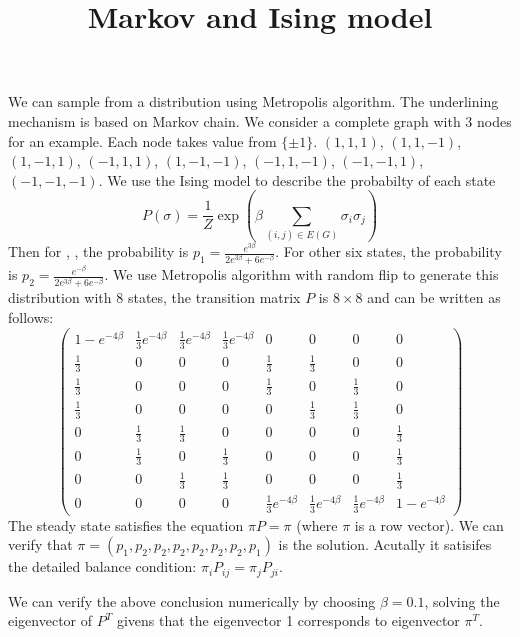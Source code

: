\documentclass{article}
\title{Markov and Ising model}
\begin{document}
\maketitle
We can sample from a distribution using Metropolis algorithm. The underlining mechanism is
based on Markov chain. We consider a complete graph with 3 nodes for an example.
Each node takes value from $\{\pm 1\}$.
 $(1,1,1)$,
 $(1,1,-1)$, $(1,-1,1)$, $(-1,1,1)$,
 $(1,-1,-1)$, $(-1,1,-1)$, $(-1,-1,1)$,
 $(-1,-1,-1)$.
We use the Ising model to describe the probabilty of each state
$$
P(\sigma) = \frac{1}{Z} \exp(\beta \sum_{(i,j) \in E(G)} \sigma_i \sigma_j)
$$
Then for , , the probability is
$p_1 = \frac{e^{3\beta}}{2e^{3\beta} + 6 e^{-\beta}}$.
For other six states, the probability is 
$p_2 = \frac{e^{-\beta}}{2e^{3\beta} + 6 e^{-\beta}}$.
We use Metropolis algorithm with random flip to generate this distribution with 8 states,
the transition matrix $P$ is  $8\times 8$ and can be written as follows:
$$
\begin{pmatrix}
1-e^{-4\beta} & \frac{1}{3} e^{-4\beta} & \frac{1}{3} e^{-4\beta} & \frac{1}{3} e^{-4\beta} & 0 & 0 & 0 & 0 \\
\frac{1}{3} & 0 & 0 & 0 & \frac{1}{3} & \frac{1}{3} & 0 & 0 \\
\frac{1}{3}& 0 & 0 & 0 & \frac{1}{3} & 0 & \frac{1}{3} & 0 \\
\frac{1}{3} & 0 & 0 & 0 & 0 & \frac{1}{3} & \frac{1}{3} & 0 \\
0 & \frac{1}{3} & \frac{1}{3} & 0 & 0 & 0 & 0 & \frac{1}{3} \\
0 & \frac{1}{3} & 0 & \frac{1}{3} & 0 & 0 & 0 & \frac{1}{3} \\
0 & 0 & \frac{1}{3} & \frac{1}{3} & 0 & 0 & 0 & \frac{1}{3} \\
0 & 0 & 0 & 0 &  \frac{1}{3} e^{-4\beta} & \frac{1}{3} e^{-4\beta} & \frac{1}{3} e^{-4\beta} & 1-e^{-4\beta}
\end{pmatrix}
$$
The steady state satisfies the equation $\pi P = \pi$ (where $\pi$ is a row vector).
We can verify that $\pi = (p_1, p_2, p_2, p_2, p_2, p_2, p_2, p_1)$ is the solution.
Acutally it satisifes the detailed balance condition: $\pi_i P_{ij} = \pi_j P_{ji}$.

We can verify the above conclusion numerically by choosing $\beta = 0.1$, solving
the eigenvector of $P^T$ givens that the eigenvector 1 corresponds to eigenvector $\pi^T$.
\end{document}
